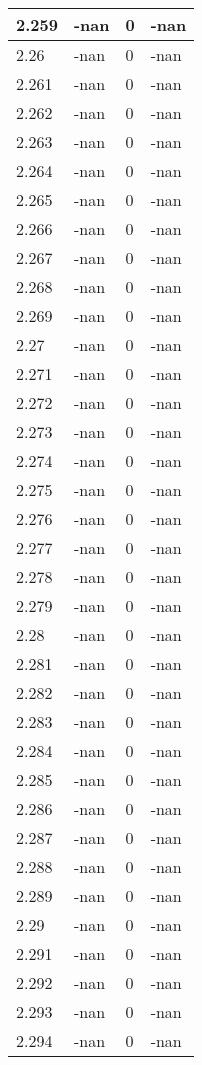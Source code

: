 \documentclass[a4paper,14pt]{extarticle}
\begin{document}
\begin{longtable}{||m{3cm}||m{3cm}|m{3cm}||m{3cm}||}
\hline
2.259 & -nan & 0 & -nan\\
\hline
2.26 & -nan & 0 & -nan\\
\hline
2.261 & -nan & 0 & -nan\\
\hline
2.262 & -nan & 0 & -nan\\
\hline
2.263 & -nan & 0 & -nan\\
\hline
2.264 & -nan & 0 & -nan\\
\hline
2.265 & -nan & 0 & -nan\\
\hline
2.266 & -nan & 0 & -nan\\
\hline
2.267 & -nan & 0 & -nan\\
\hline
2.268 & -nan & 0 & -nan\\
\hline
2.269 & -nan & 0 & -nan\\
\hline
2.27 & -nan & 0 & -nan\\
\hline
2.271 & -nan & 0 & -nan\\
\hline
2.272 & -nan & 0 & -nan\\
\hline
2.273 & -nan & 0 & -nan\\
\hline
2.274 & -nan & 0 & -nan\\
\hline
2.275 & -nan & 0 & -nan\\
\hline
2.276 & -nan & 0 & -nan\\
\hline
2.277 & -nan & 0 & -nan\\
\hline
2.278 & -nan & 0 & -nan\\
\hline
2.279 & -nan & 0 & -nan\\
\hline
2.28 & -nan & 0 & -nan\\
\hline
2.281 & -nan & 0 & -nan\\
\hline
2.282 & -nan & 0 & -nan\\
\hline
2.283 & -nan & 0 & -nan\\
\hline
2.284 & -nan & 0 & -nan\\
\hline
2.285 & -nan & 0 & -nan\\
\hline
2.286 & -nan & 0 & -nan\\
\hline
2.287 & -nan & 0 & -nan\\
\hline
2.288 & -nan & 0 & -nan\\
\hline
2.289 & -nan & 0 & -nan\\
\hline
2.29 & -nan & 0 & -nan\\
\hline
2.291 & -nan & 0 & -nan\\
\hline
2.292 & -nan & 0 & -nan\\
\hline
2.293 & -nan & 0 & -nan\\
\hline
2.294 & -nan & 0 & -nan\\

\end{longtable}
\end{document}
